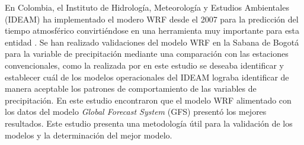 \documentclass[11pt]{article}
\begin{document}
En Colombia, el Instituto de Hidrología, Meteorología y Estudios Ambientales (IDEAM) ha implementado el modero WRF desde el 2007 para la predicción del tiempo atmosférico convirtiéndose en una herramienta muy importante para esta entidad \citep{Arango2011}. Se han realizado validaciones del modelo WRF en la Sabana de Bogotá para la variable de precipitación mediante una comparación con las estaciones convencionales, como la realizada por \citet{Mejia2012} en este estudio se deseaba identificar y establecer cuál de los modelos operacionales del IDEAM lograba identificar de manera aceptable los patrones de comportamiento de las variables de precipitación. En este estudio encontraron que el modelo WRF alimentado con los datos del modelo \textit{Global Forecast System} (GFS) presentó los mejores resultados. Este estudio presenta una metodología útil para la validación de los modelos y la determinación del mejor modelo.\\








\end{document}
